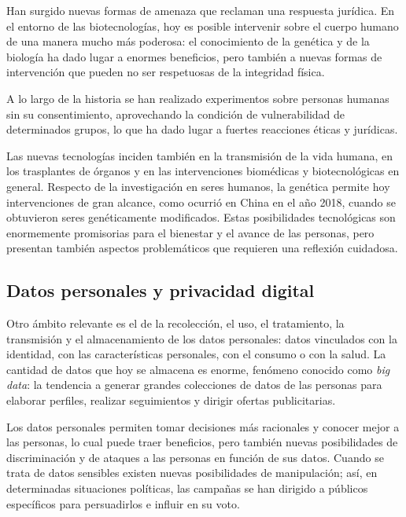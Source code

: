 \documentclass[12pt,oneside]{book}
\begin{document}
Han surgido nuevas formas de amenaza que reclaman una respuesta jurídica. En el entorno de las biotecnologías, hoy es posible intervenir sobre el cuerpo humano de una manera mucho más poderosa: el conocimiento de la genética y de la biología ha dado lugar a enormes beneficios, pero también a nuevas formas de intervención que pueden no ser respetuosas de la integridad física.

\begin{note}
A lo largo de la historia se han realizado experimentos sobre personas humanas sin su consentimiento, aprovechando la condición de vulnerabilidad de determinados grupos, lo que ha dado lugar a fuertes reacciones éticas y jurídicas.
\end{note}

Las nuevas tecnologías inciden también en la transmisión de la vida humana, en los trasplantes de órganos y en las intervenciones biomédicas y biotecnológicas en general. Respecto de la investigación en seres humanos, la genética permite hoy intervenciones de gran alcance, como ocurrió en China en el año 2018, cuando se obtuvieron seres genéticamente modificados. Estas posibilidades tecnológicas son enormemente promisorias para el bienestar y el avance de las personas, pero presentan también aspectos problemáticos que requieren una reflexión cuidadosa.

\subsection{Datos personales y privacidad digital}

Otro ámbito relevante es el de la recolección, el uso, el tratamiento, la transmisión y el almacenamiento de los datos personales: datos vinculados con la identidad, con las características personales, con el consumo o con la salud. La cantidad de datos que hoy se almacena es enorme, fenómeno conocido como \textit{big data}: la tendencia a generar grandes colecciones de datos de las personas para elaborar perfiles, realizar seguimientos y dirigir ofertas publicitarias.

Los datos personales permiten tomar decisiones más racionales y conocer mejor a las personas, lo cual puede traer beneficios, pero también nuevas posibilidades de discriminación y de ataques a las personas en función de sus datos. Cuando se trata de datos sensibles existen nuevas posibilidades de manipulación; así, en determinadas situaciones políticas, las campañas se han dirigido a públicos específicos para persuadirlos e influir en su voto.
\end{document}
